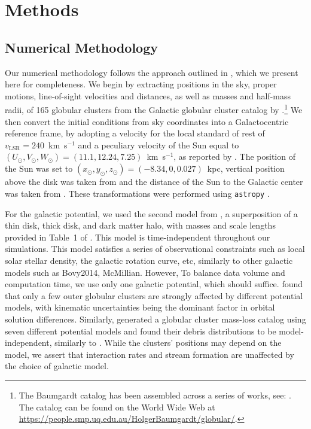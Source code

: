 \documentclass[draft]{aa}
\begin{document}
\section{Methods}

  \subsection{Numerical Methodology}
    Our numerical methodology follows the approach outlined in \citet{2023A&A...673A..44F}, which we present here for completeness. We begin by extracting positions in the sky, proper motions, line-of-sight velocities and distances, as well as masses and half-mass radii, of 165 globular clusters from the Galactic globular cluster catalog by \cite{2021MNRAS.505.5957B}.\footnote{The Baumgardt catalog has been assembled across a series of works, see: \cite{2020PASA...37...46B,2019MNRAS.482.5138B,2018MNRAS.478.1520B}. The catalog can be found on the World Wide Web at \href{https://people.smp.uq.edu.au/HolgerBaumgardt/globular/}{https://people.smp.uq.edu.au/HolgerBaumgardt/globular/}.} We then convert the initial conditions from sky coordinates into a Galactocentric reference frame, by adopting a velocity for the local standard of rest of $v_{\text{LSR}} = 240$~km~s$^{-1}$ and a peculiary velocity of the Sun equal to $(U_\odot, V_\odot, W_\odot)=(11.1, 12.24, 7.25)$~km~s$^{-1}$, as reported by \citet{2012MNRAS.427..274S}.  The position of the Sun was set to $(x_\odot,y_\odot,z_\odot) = (-8.34,0,0.027)$~kpc, vertical position above the disk was taken from \citet{2001ApJ...553..184C} and the distance of the Sun to the Galactic center was taken from \citet{2014ApJ...783..130R}. These transformations were performed using \texttt{astropy} \citep{2013A&A...558A..33A}.


    For the galactic potential, we used the second model from \citet{2017A&A...598A..66P}, a superposition of a thin disk, thick disk, and dark matter halo, with masses and scale lengths provided in Table~1 of \citet{2023A&A...673A..44F}. This model is time-independent throughout our simulations. This model satisfies a series of observational constraints such as local solar stellar density, the galactic rotation curve, etc, similarly to other galactic models such as Bovy2014, McMillian. However, To balance data volume and computation time, we use only one galactic potential, which should suffice. \citet{2021MNRAS.505.5978V} found that only a few outer globular clusters are strongly affected by different potential models, with kinematic uncertainties being the dominant factor in orbital solution differences. Similarly, \citet{2024MNRAS.528.5189G} generated a globular cluster mass-loss catalog using seven different potential models and found their debris distributions to be model-independent, similarly to \citet{2023A&A...673A..44F}. While the clusters' positions may depend on the model, we assert that interaction rates and stream formation are unaffected by the choice of galactic model.    
\end{document}
